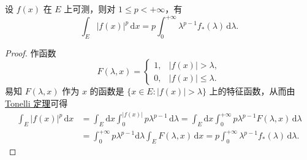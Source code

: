\documentclass[../../main.tex]{subfiles}
\begin{document}
\begin{theorem}
设 \( f(x) \) 在 \( E \) 上可测，则对 \( 1 \leqslant  p < +\infty \)，有
\[
\int_E |f(x)|^p \, \mathrm{d}x = p \int_0^{+\infty} \lambda^{p - 1} f_*(\lambda) \, \mathrm{d}\lambda. \tag{4.17}
\]
\end{theorem}
\begin{proof}
作函数
\[
F(\lambda, x) = 
\begin{cases} 
1, & |f(x)| > \lambda, \\
0, & |f(x)| \leqslant  \lambda.
\end{cases}
\]
易知 \( F(\lambda, x) \) 作为 \( x \) 的函数是 \( \{ x \in E : |f(x)| > \lambda \} \) 上的特征函数，从而由 \hyperref[theorem:Tonelli 定理 非负可测函数的情形]{Tonelli 定理}可得
\begin{align*}
\int_E |f(x)|^p \, \mathrm{d}x &= \int_E \mathrm{d}x \int_0^{|f(x)|} p\lambda^{p - 1} \, \mathrm{d}\lambda = \int_E \mathrm{d}x \int_0^{+\infty} p\lambda^{p - 1} F(\lambda, x) \, \mathrm{d}\lambda \\
&= \int_0^{+\infty} p\lambda^{p - 1} \mathrm{d}\lambda \int_E F(\lambda, x) \, \mathrm{d}x = p \int_0^{+\infty} \lambda^{p - 1} f_*(\lambda) \, \mathrm{d}\lambda.
\end{align*}

\end{proof}
\end{document}
